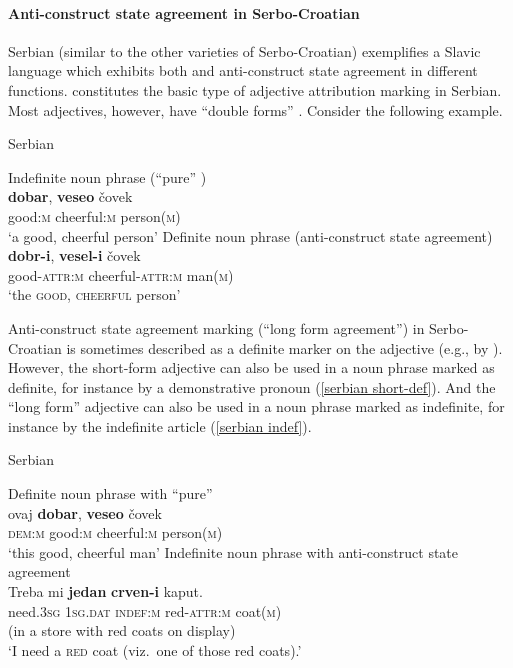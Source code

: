 \paragraph*{Anti\hyp{}construct state agreement in Serbo-Croatian}
\label{serbian synchr}
Serbian (similar to the other varieties of Serbo-Croatian) exemplifies a Slavic language which exhibits both  and anti\hyp{}construct state agreement in different functions.  constitutes the basic type of adjective attribution marking in Serbian. Most adjectives, however, have “double forms” \citep[179–180]{kramsky1972}. Consider the following example.
\begin{exe}
\ex \rm{Serbian \citep[59]{zlatic1997}}
\begin{xlist}
\ex \rm{Indefinite noun phrase (“pure” )}\\
\gll	\textbf{dobar}, \textbf{veseo} čovek\\
	good:\textsc{m} cheerful:\textsc{m} person(\textsc{m})\\
\glt	‘a good, cheerful person’
\ex \rm{Definite noun phrase (anti\hyp{}construct state agreement)}\\
\gll	\textbf{dobr-i}, \textbf{vesel-i} čovek\\
	good-\textsc{attr:m} cheerful-\textsc{attr:m} man(\textsc{m})\\
\glt	‘the \textsc{good}, \textsc{cheerful} person’
\end{xlist}
\end{exe}
Anti\hyp{}construct state agreement marking (“long form agreement”) in Serbo\hyp{}Croatian is sometimes described as a definite marker on the adjective (e.g., by \citealt[18–19]{kordic1997}). However, the short-form adjective can also be used in a noun phrase marked as definite, for instance by a demonstrative pronoun (\ref{serbian short-def}). And the “long form” adjective can also be used in a noun phrase marked as indefinite, for instance by the indefinite article (\ref{serbian indef}). 
\begin{exe}
\ex \rm{Serbian \citep{marusic-etal2007}}
\begin{xlist}
\ex \rm{Definite noun phrase with “pure” }\\
\label{serbian short-def} 
\gll	ovaj \textbf{dobar}, \textbf{veseo} \v{c}ovek\\
	\textsc{dem:m} good:\textsc{m} cheerful:\textsc{m} person(\textsc{m})\\
\glt	‘this good, cheerful man’
\ex \rm{Indefinite noun phrase with anti\hyp{}construct state agreement}\\
\label{serbian indef}
\gll	Treba mi \textbf{jedan} \textbf{crven-i} kaput.\\
	need.\textsc{3sg} \textsc{1sg.dat} \textsc{indef:m} red-\textsc{attr:m} coat(\textsc{m})\\
\glt (in a store with red coats on display)\\‘I need a \textsc{red} coat (viz.~one of those red coats).’
\end{xlist}
\end{exe}
